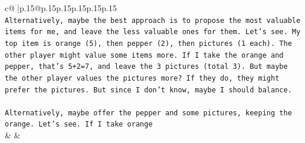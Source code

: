 \documentclass{article}
\begin{document}
{\begin{supertabular}{c@{$\;$}|p{.15\linewidth}@{}p{.15\linewidth}p{.15\linewidth}p{.15\linewidth}p{.15\linewidth}p{.15\linewidth}}
{{{\\ 
\texttt{Alternatively, maybe the best approach is to propose the most valuable items for me, and leave the less valuable ones for them. Let's see. My top item is orange (5), then pepper (2), then pictures (1 each). The other player might value some items more. If I take the orange and pepper, that's 5+2=7, and leave the 3 pictures (total 3). But maybe the other player values the pictures more? If they do, they might prefer the pictures. But since I don't know, maybe I should balance.} \\
\\ 
\texttt{Alternatively, maybe offer the pepper and some pictures, keeping the orange. Let's see. If I take orange} \\
            }
        }
    }
    & & \\ \\


\end{supertabular}}
\end{document}
